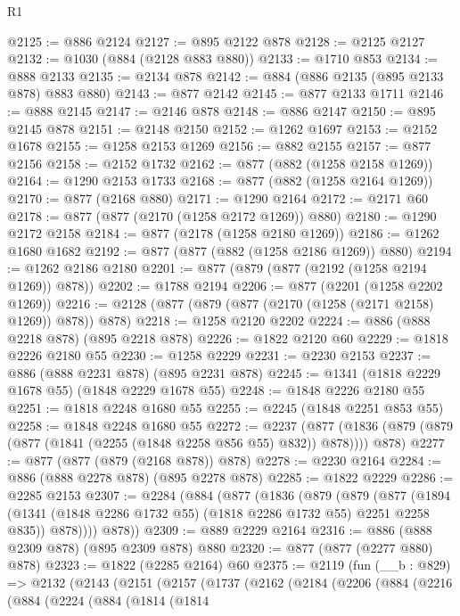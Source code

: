\begin{lexlean}{R1}
\begin{coremodule}
@2125 := @886 @2124
@2127 := @895 @2122 @878
@2128 := @2125 @2127
@2132 := @1030 (@884 (@2128 @883 @880))
@2133 := @1710 @853
@2134 := @888 @2133
@2135 := @2134 @878
@2142 := @884 (@886 @2135 (@895 @2133 @878) @883 @880)
@2143 := @877 @2142
@2145 := @877 @2133 @1711
@2146 := @888 @2145
@2147 := @2146 @878
@2148 := @886 @2147
@2150 := @895 @2145 @878
@2151 := @2148 @2150
@2152 := @1262 @1697
@2153 := @2152 @1678
@2155 := @1258 @2153 @1269
@2156 := @882 @2155
@2157 := @877 @2156
@2158 := @2152 @1732
@2162 := @877 (@882 (@1258 @2158 @1269))
@2164 := @1290 @2153 @1733
@2168 := @877 (@882 (@1258 @2164 @1269))
@2170 := @877 (@2168 @880)
@2171 := @1290 @2164
@2172 := @2171 @60
@2178 := @877 (@877 (@2170 (@1258 @2172 @1269)) @880)
@2180 := @1290 @2172 @2158
@2184 := @877 (@2178 (@1258 @2180 @1269))
@2186 := @1262 @1680 @1682
@2192 := @877 (@877 (@882 (@1258 @2186 @1269)) @880)
@2194 := @1262 @2186 @2180
@2201 := @877 (@879 (@877 (@2192 (@1258 @2194 @1269)) @878))
@2202 := @1788 @2194
@2206 := @877 (@2201 (@1258 @2202 @1269))
@2216 := @2128 (@877 (@879 (@877 (@2170 (@1258 (@2171 @2158) @1269)) @878)) @878)
@2218 := @1258 @2120 @2202
@2224 := @886 (@888 @2218 @878) (@895 @2218 @878)
@2226 := @1822 @2120 @60
@2229 := @1818 @2226 @2180 @55
@2230 := @1258 @2229
@2231 := @2230 @2153
@2237 := @886 (@888 @2231 @878) (@895 @2231 @878)
@2245 := @1341 (@1818 @2229 @1678 @55) (@1848 @2229 @1678 @55)
@2248 := @1848 @2226 @2180 @55
@2251 := @1818 @2248 @1680 @55
@2255 := @2245 (@1848 @2251 @853 @55)
@2258 := @1848 @2248 @1680 @55
@2272 := @2237
    (@877 (@1836 (@879 (@879 (@877 (@1841 (@2255 (@1848 @2258 @856 @55) @832)) @878)))) @878)
@2277 := @877 (@877 (@879 (@2168 @878)) @878)
@2278 := @2230 @2164
@2284 := @886 (@888 @2278 @878) (@895 @2278 @878)
@2285 := @1822 @2229
@2286 := @2285 @2153
@2307 := @2284
    (@884
      (@877
        (@1836
          (@879
            (@879
              (@877
                (@1894 (@1341 (@1848 @2286 @1732 @55) (@1818 @2286 @1732 @55) @2251 @2258 @835))
                @878))))
        @878))
@2309 := @889 @2229 @2164
@2316 := @886 (@888 @2309 @878) (@895 @2309 @878) @880
@2320 := @877 (@877 (@2277 @880) @878)
@2323 := @1822 (@2285 @2164) @60
@2375 := @2119
    (fun (__b : @829) =>
    @2132
      (@2143
        (@2151
          (@2157
            (@1737
              (@2162
                (@2184
                  (@2206
                    (@884
                      (@2216
                        (@884
                          (@2224
                            (@884
                              (@1814
                                (@1814

\end{coremodule}
\end{lexlean}
